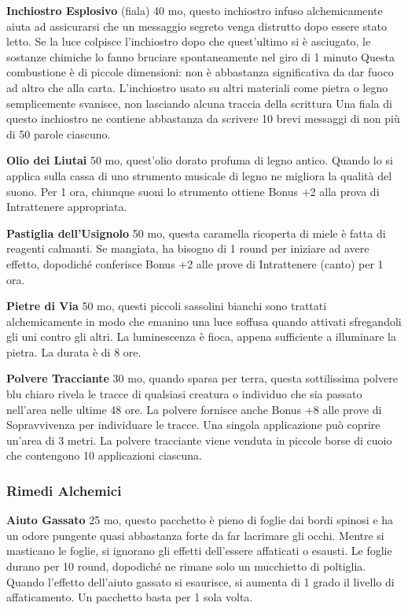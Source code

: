 \documentclass[12pt,a4paper,twoside,openany]{book}
\begin{document}
\begin{multicols}{2}
\textbf{Inchiostro Esplosivo} (fiala) 40 mo, questo inchiostro infuso alchemicamente aiuta ad assicurarsi che un messaggio segreto venga distrutto dopo essere stato letto. Se la luce colpisce l'inchiostro dopo che quest'ultimo si è asciugato, le sostanze chimiche lo fanno bruciare spontaneamente nel giro di 1 minuto
Questa combustione è di piccole dimensioni: non è abbastanza significativa da dar fuoco ad altro che alla carta. L'inchiostro usato su altri materiali come pietra o legno semplicemente svanisce, non lasciando alcuna traccia della scrittura
Una fiala di questo inchiostro ne contiene abbastanza da scrivere 10 brevi messaggi di non più di 50 parole ciascuno.

\textbf{Olio dei Liutai} 50 mo, quest'olio dorato profuma di legno antico. Quando lo si applica sulla cassa di uno strumento musicale di legno ne migliora la qualità del suono. Per 1 ora, chiunque suoni lo strumento ottiene Bonus +2 alla prova di Intrattenere appropriata.

\textbf{Pastiglia dell'Usignolo} 50 mo, questa caramella ricoperta di miele è fatta di reagenti calmanti. Se mangiata, ha bisogno di 1 round per iniziare ad avere effetto, dopodiché conferisce Bonus +2 alle prove di Intrattenere (canto) per 1 ora.

\textbf{Pietre di Via} 50 mo, questi piccoli sassolini bianchi sono trattati alchemicamente in modo che emanino una luce soffusa quando attivati sfregandoli gli uni contro gli altri. La luminescenza è fioca, appena sufficiente a illuminare la pietra. La durata è di 8 ore.

\textbf{Polvere Tracciante} 30 mo, quando sparsa per terra, questa sottilissima polvere blu chiaro rivela le tracce di qualsiasi creatura o individuo che sia passato nell'area nelle ultime 48 ore.
La polvere fornisce anche Bonus +8 alle prove di Sopravvivenza per individuare le tracce. Una singola applicazione può coprire un'area di 3 metri. La polvere tracciante viene venduta in piccole borse di cuoio che contengono 10 applicazioni ciascuna.

\subsubsection{Rimedi Alchemici}

\label{rimedi-alchemici}

\textbf{Aiuto Gassato} 25 mo, questo pacchetto è pieno di foglie dai bordi spinosi e ha un odore pungente quasi abbastanza forte da far lacrimare gli occhi. Mentre si masticano le foglie, si ignorano gli effetti dell'essere affaticati o esausti. Le foglie durano per 10 round, dopodiché ne rimane solo un mucchietto di poltiglia.
Quando l'effetto dell'aiuto gassato si esaurisce, si aumenta di 1 grado il livello di affaticamento. Un pacchetto basta per 1 sola volta.


\end{multicols}
\end{document}
